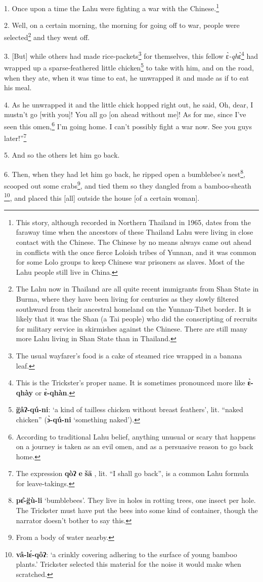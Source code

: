 \setcounter{footnote}{0}

1. Once upon a time the Lahu were fighting a war with the Chinese.\footnote{This story, although recorded in Northern Thailand in 1965, dates from the faraway time when the ancestors of these Thailand Lahu were living in close contact with the Chinese. The Chinese by no means always came out ahead in conflicts with the once fierce Loloish tribes of Yunnan, and it was common for some Lolo groups to keep Chinese war prisoners as slaves. Most of the Lahu people still live in China.}

2. Well, on a certain morning, the morning for going off to war, people were selected\footnote{The Lahu now in Thailand are all quite recent immigrants from Shan State in Burma, where they have been living for centuries as they slowly filtered southward from their ancestral homeland on the Yunnan-Tibet border. It is likely that it was the Shan (a Tai people) who did the conscripting of recruits for military service in skirmishes against the Chinese. There are still many more Lahu living in Shan State than in Thailand.}
and they went off.

3. [But] while others had made rice-packets\footnote{The usual wayfarer's food is a cake of steamed rice wrapped in a banana leaf.} for themselves, this fellow ɛ̀\textit{-qh}ɛ̀\footnote{This is the Trickster's proper name. It is sometimes pronounced more like \textbf{ɛ̀-qhày} or \textbf{ɛ̀-qhàn}.}
had wrapped up a sparse-feathered little chicken\footnote{\textbf{g̈âʔ-qú-ni}: `a kind of tailless chicken without breast feathers', lit. ``naked chicken'' (\textbf{ɔ̀-qú-ni} `something naked').} to take with him, and on the
road, when they ate, when it was time to eat, he unwrapped it and made as if to
eat his meal.

4. As he unwrapped it and the little chick hopped right out, he said, Oh, dear,
I mustn't go [with you]! You all go [on ahead without me]! As for me, since I've
seen this omen,\footnote{According to traditional Lahu belief, anything unusual or scary that happens on a journey is taken as an evil omen, and as a persuasive reason to go back home.} I'm going home. I can't possibly fight a war now. See you guys
later!''\footnote{The expression \textbf{qòʔ} \textbf{e} \textbf{šā} , lit. ``I shall go back'', is a common Lahu formula for leave-takings.}

5. And so the others let him go back.

6. Then, when they had let him go back, he ripped open a bumblebee's nest\footnote{\textbf{pɛ̂-g̈ù-li} `bumblebees'. They live in holes in rotting trees, one insect per hole. The Trickster must have put the bees into some kind of container, though the narrator doesn't bother to say this.},
scooped out some crabs\footnote{From a body of water nearby.}, and tied them so they dangled from a bamboo-sheath
\footnote{\textbf{vâ-lɛ́-qôʔ}: `a crinkly covering adhering to the surface of young bamboo plants.' Trickster selected this material for the noise it would make when scratched.}, and placed this [all] outside the house [of a certain woman].

